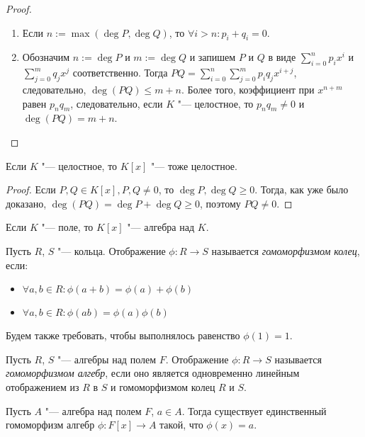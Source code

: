 \begin{proof}~
	\begin{enumerate}
		\item Если $n := \max{(\deg{P}, \deg{Q})}$, то $\forall i > n: p_i + q_i = 0$.
		\item Обозначим $n := \deg{P}$ и $m := \deg{Q}$ и запишем $P$ и $Q$ в виде $\sum_{i = 0}^{n}p_ix^i$ и $\sum_{j = 0}^{m}q_jx^j$ соответственно. Тогда $PQ = \sum_{i = 0}^{n}\sum_{j = 0}^{m}p_iq_jx^{i + j}$, следовательно, $\deg{(PQ)} \le m + n$. Более того, коэффициент при $x^{n + m}$ равен $p_nq_m$, следовательно, если $K$ "--- целостное, то $p_nq_m \ne 0$ и $\deg{(PQ)} = m + n$.\qedhere
	\end{enumerate}
\end{proof}

\begin{corollary}
	Если $K$ "--- целостное, то $K[x]$ "--- тоже целостное.
\end{corollary}

\begin{proof}
	Если $P, Q \in K[x], P, Q \ne 0$, то $\deg{P}, \deg{Q} \ge 0$. Тогда, как уже было доказано, $\deg{(PQ)} = \deg{P} + \deg{Q} \ge 0$, поэтому $PQ \ne 0$.
\end{proof}

\begin{note}
	Если $K$ "--- поле, то $K[x]$ "--- алгебра над $K$.
\end{note}

\begin{definition}
	Пусть $R$, $S$ "--- кольца. Отображение $\phi: R \rightarrow S$ называется \textit{гомоморфизмом колец}, если:
	\begin{itemize}
		\item $\forall a, b \in R: \phi(a + b) = \phi(a) + \phi(b)$
		\item $\forall a, b \in R: \phi(ab) = \phi(a)\phi(b)$
	\end{itemize}
	
	Будем также требовать, чтобы выполнялось равенство $\phi(1) = 1$.
\end{definition}

\begin{definition}
	Пусть $R$, $S$ "--- алгебры над полем $F$. Отображение $\phi: R \rightarrow S$ называется \textit{гомоморфизмом алгебр}, если оно является одновременно линейным отображением из $R$ в $S$ и гомоморфизмом колец $R$ и $S$.
\end{definition}

\begin{proposition}
	Пусть $A$ "--- алгебра над полем $F$, $a \in A$. Тогда существует единственный гомоморфизм алгебр $\phi: F[x] \rightarrow A$ такой, что $\phi(x) = a$.
\end{proposition}

